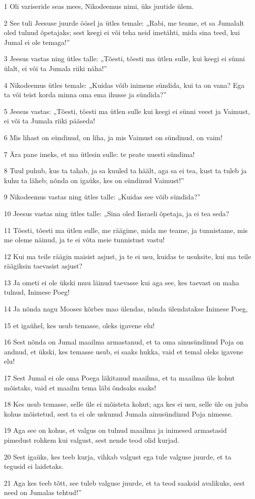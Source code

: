 \par 1 Oli variseride seas mees, Nikodeemus nimi, üks juutide ülem.
\par 2 See tuli Jeesuse juurde öösel ja ütles temale: „Rabi, me teame, et sa Jumalalt oled tulnud õpetajaks; sest keegi ei või teha neid imetähti, mida sina teed, kui Jumal ei ole temaga!”
\par 3 Jeesus vastas ning ütles talle: „Tõesti, tõesti ma ütlen sulle, kui keegi ei sünni ülalt, ei või ta Jumala riiki näha!”
\par 4 Nikodeemus ütles temale: „Kuidas võib inimene sündida, kui ta on vana? Ega ta või teist korda minna oma ema ihusse ja sündida?”
\par 5 Jeesus vastas: „Tõesti, tõesti ma ütlen sulle kui keegi ei sünni veest ja Vaimust, ei või ta Jumala riiki pääseda!
\par 6 Mis lihast on sündinud, on liha, ja mis Vaimust on sündinud, on vaim!
\par 7 Ära pane imeks, et ma ütlesin sulle: te peate uuesti sündima!
\par 8 Tuul puhub, kus ta tahab, ja sa kuuled ta häält, aga sa ei tea, kust ta tuleb ja kuhu ta läheb; nõnda on igaüks, kes on sündinud Vaimust!”
\par 9 Nikodeemus vastas ning ütles talle: „Kuidas see võib sündida?”
\par 10 Jeesus vastas ning ütles talle: „Sina oled Iisraeli õpetaja, ja ei tea seda?
\par 11 Tõesti, tõesti ma ütlen sulle, me räägime, mida me teame, ja tunnistame, mis me oleme näinud, ja te ei võta meie tunnistust vastu!
\par 12 Kui ma teile räägin maisist asjust, ja te ei usu, kuidas te usuksite, kui ma teile räägiksin taevasist asjust?
\par 13 Ja ometi ei ole ükski muu läinud taevasse kui aga see, kes taevast on maha tulnud, Inimese Poeg!
\par 14 Ja nõnda nagu Mooses kõrbes mao ülendas, nõnda ülendatakse Inimese Poeg,
\par 15 et igaühel, kes usub temasse, oleks igavene elu!
\par 16 Sest nõnda on Jumal maailma armastanud, et ta oma ainusündinud Poja on andnud, et ükski, kes temasse usub, ei saaks hukka, vaid et temal oleks igavene elu!
\par 17 Sest Jumal ei ole oma Poega läkitanud maailma, et ta maailma üle kohut mõistaks, vaid et maailm tema läbi õndsaks saaks!
\par 18 Kes usub temasse, selle üle ei mõisteta kohut; aga kes ei usu, selle üle on juba kohus mõistetud, sest ta ei ole uskunud Jumala ainusündinud Poja nimesse.
\par 19 Aga see on kohus, et valgus on tulnud maailma ja inimesed armastasid pimedust rohkem kui valgust, sest nende teod olid kurjad.
\par 20 Sest igaüks, kes teeb kurja, vihkab valgust ega tule valguse juurde, et ta tegusid ei laidetaks.
\par 21 Aga kes teeb tõtt, see tuleb valguse juurde, et ta teod saaksid avalikuks, sest need on Jumalas tehtud!”


